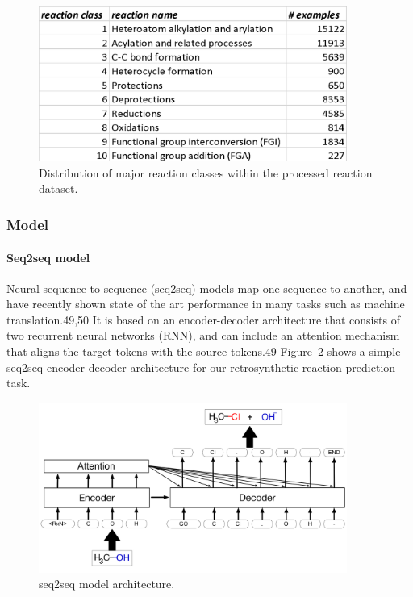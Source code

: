 \begin{figure}
  \centering
  \includegraphics[width=0.9\textwidth]{Images/ret_table_1.png}
  \caption{Distribution of major reaction classes within the processed reaction dataset.}
  \label{fig:ret_table_1}
\end{figure}

\subsubsection{Model}

\paragraph{Seq2seq model}

Neural sequence-to-sequence (seq2seq) models map one sequence to another, and have recently shown state of the art performance in many tasks such as machine translation.49,50 It is based on an encoder-decoder architecture that consists of two recurrent neural networks (RNN), and can include an attention mechanism that aligns the target tokens with the source tokens.49 Figure~\ref{fig:ret_seq2seq} shows a simple seq2seq encoder-decoder architecture for our retrosynthetic reaction prediction task.

\begin{figure}
  \centering
  \includegraphics[width=0.9\textwidth]{Images/ret_seq2seq.png}
  \caption{seq2seq model architecture.}
  \label{fig:ret_seq2seq}
\end{figure}

